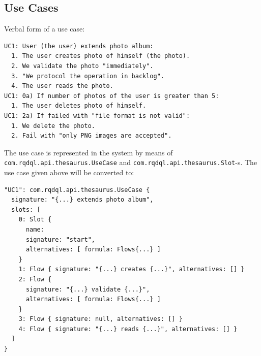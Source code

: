 \documentclass[12pt,oneside,letterpaper]{article}
\begin{document}

    \subsection{Use Cases}

        Verbal form of a use case:

        \begin{verbatim}
UC1: User (the user) extends photo album:
  1. The user creates photo of himself (the photo).
  2. We validate the photo "immediately".
  3. "We protocol the operation in backlog".
  4. The user reads the photo.
UC1: 0a) If number of photos of the user is greater than 5:
  1. The user deletes photo of himself.
UC1: 2a) If failed with "file format is not valid":
  1. We delete the photo.
  2. Fail with "only PNG images are accepted".\end{verbatim}

        The use case is represented in the system by means of
        \texttt{com.rqdql.api.thesaurus.UseCase} and \texttt{com.rqdql.api.thesaurus.Slot}-s. The
        use case given above will be converted to:

        \begin{verbatim}
"UC1": com.rqdql.api.thesaurus.UseCase {
  signature: "{...} extends photo album",
  slots: [
    0: Slot {
      name:
      signature: "start",
      alternatives: [ formula: Flows{...} ]
    }
    1: Flow { signature: "{...} creates {...}", alternatives: [] }
    2: Flow {
      signature: "{...} validate {...}",
      alternatives: [ formula: Flows{...} ]
    }
    3: Flow { signature: null, alternatives: [] }
    4: Flow { signature: "{...} reads {...}", alternatives: [] }
  ]
}\end{verbatim}
\end{document}
